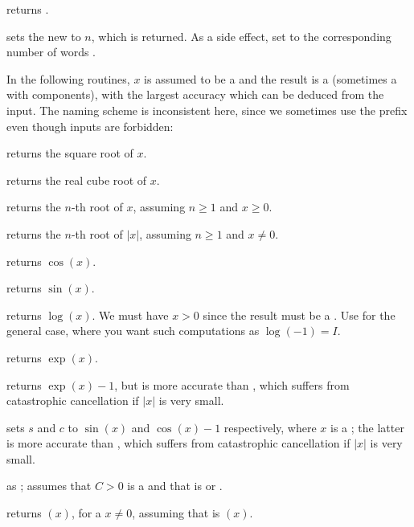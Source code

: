  returns .

 sets the new
 to $n$, which is returned. As a side effect, set
 to the corresponding number of words .


In the following routines, $x$ is assumed to be a  and the result
is a  (sometimes a  with  components), with
the largest accuracy which can be deduced from the input. The naming scheme
is inconsistent here, since we sometimes use the prefix  even though
 inputs are forbidden:

 returns the square root of $x$.

 returns the real cube root of $x$.

 returns the $n$-th root of $x$, assuming
$n\geq 1$ and $x \geq 0$.

 returns the $n$-th root of $|x|$,
assuming $n\geq 1$ and $x \neq 0$.

 returns $\cos(x)$.

 returns $\sin(x)$.

 returns $\log(x)$. We must have $x > 0$
since the result must be a . Use  for the general case,
where you want such computations as $\log(-1) = I$.

 returns $\exp(x)$.

 returns $\exp(x)-1$, but is more accurate than
, which suffers from catastrophic cancellation if
$|x|$ is very small.

 sets $s$ and $c$ to
$\sin(x)$ and $\cos(x)-1$ respectively, where $x$ is a ; the latter
is more accurate than , which suffers from
catastrophic cancellation if $|x|$ is very small.

 as ; assumes
that $C > 0$ is a  and that  is  or .

 returns $(x)$, for a 
$x\neq 0$, assuming that  is $(x)$.

